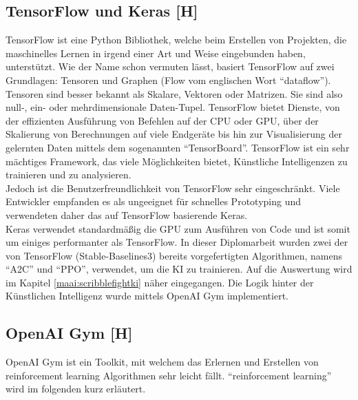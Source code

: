 \subsection{TensorFlow und Keras [H]}
TensorFlow ist eine Python Bibliothek, welche beim Erstellen von Projekten, die maschinelles Lernen
in irgend einer Art und Weise eingebunden haben, unterstützt.
Wie der Name schon vermuten lässt, basiert TensorFlow auf zwei Grundlagen: Tensoren und Graphen (Flow
vom englischen Wort ``dataflow''). \\
Tensoren sind besser bekannt als Skalare, Vektoren oder Matrizen. Sie sind also
null-, ein- oder mehrdimensionale Daten-Tupel.
TensorFlow bietet Dienste, von der effizienten Ausführung von
Befehlen auf der CPU oder GPU, über der Skalierung von Berechnungen auf viele Endgeräte bis hin
zur Visualisierung der gelernten Daten mittels dem sogenannten ``TensorBoard''. TensorFlow ist ein
sehr mächtiges Framework, das viele Möglichkeiten bietet, Künstliche Intelligenzen zu trainieren und
zu analysieren.\\
Jedoch ist die Benutzerfreundlichkeit von TensorFlow sehr eingeschränkt. Viele Entwickler empfanden
es als ungeeignet für schnelles Prototyping und verwendeten daher das auf TensorFlow basierende Keras. \\
Keras verwendet standardmäßig die GPU zum Ausführen von Code und ist somit um einiges performanter als TensorFlow.
In dieser Diplomarbeit wurden zwei der von TensorFlow (Stable-Baselines3) bereits vorgefertigten Algorithmen,
namens ``A2C'' und ``PPO'', verwendet, um die KI zu trainieren. Auf die Auswertung wird im Kapitel \ref{maai:scribblefightki} näher
eingegangen. Die Logik hinter der Künstlichen Intelligenz
wurde mittels OpenAI Gym implementiert.

\subsection{OpenAI Gym [H]}
OpenAI Gym ist ein Toolkit, mit welchem das Erlernen und Erstellen von reinforcement learning Algorithmen
sehr leicht fällt. ``reinforcement learning'' wird im folgenden
kurz erläutert.

